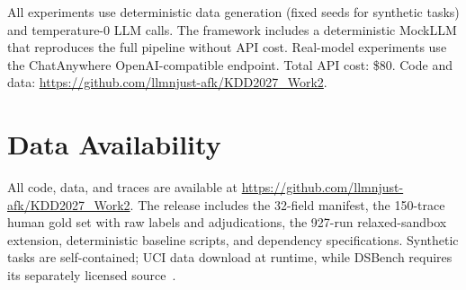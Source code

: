 All experiments use deterministic data generation (fixed seeds for synthetic tasks) and temperature-0 LLM calls. The framework includes a deterministic MockLLM that reproduces the full pipeline without API cost. Real-model experiments use the ChatAnywhere OpenAI-compatible endpoint. Total API cost: \$80. Code and data: \url{https://github.com/llmnjust-afk/KDD2027_Work2}.

\section{Data Availability}
\label{app:data-avail}

All code, data, and traces are available at \url{https://github.com/llmnjust-afk/KDD2027_Work2}. The release includes the 32-field manifest, the 150-trace human gold set with raw labels and adjudications, the 927-run relaxed-sandbox extension, deterministic baseline scripts, and dependency specifications. Synthetic tasks are self-contained; UCI data download at runtime, while DSBench requires its separately licensed source~\citep{jing2024dsbench}.

